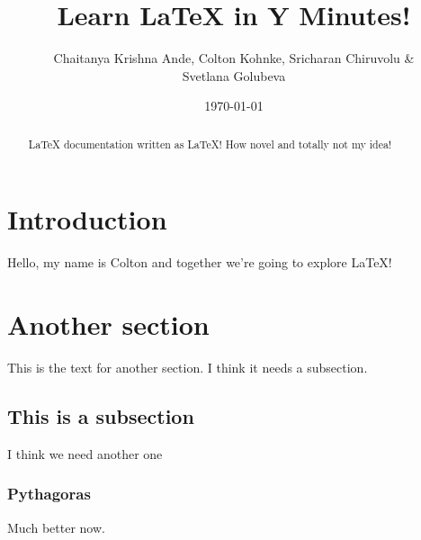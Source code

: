 \documentclass[12pt]{article}
\author{Chaitanya Krishna Ande, Colton Kohnke, Sricharan Chiruvolu \& \\
Svetlana Golubeva}
\date{\today}
\title{Learn \LaTeX \hspace{1pt} in Y Minutes!}
\begin{document}
 
\maketitle

\newpage
\tableofcontents

\newpage

\begin{abstract}
 \LaTeX \hspace{1pt} documentation written as \LaTeX! How novel and totally not
 my idea!
\end{abstract}

\section{Introduction}
Hello, my name is Colton and together we're going to explore \LaTeX!

\section{Another section}
This is the text for another section. I think it needs a subsection.

\subsection{This is a subsection} %
I think we need another one

\subsubsection{Pythagoras}
Much better now.
\label{subsec:pythagoras}

\end{document}
